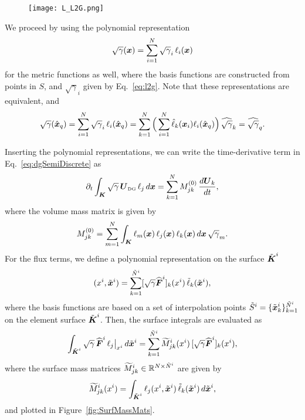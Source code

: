 \documentclass[10pt,preprint]{aastex}
\begin{document}
\begin{figure}[h]
  \begin{center}
     \texttt{[image: L\_L2G.png]}
  \end{center}
  \caption{}
  \label{fig:LL2G}
\end{figure}

We proceed by using the polynomial representation
\begin{equation}
  \sqrt{\gamma}(\boldsymbol{x})=\sum_{i=1}^{N}\sqrt{\gamma}_{i}\,\ell_{i}(\boldsymbol{x})
\end{equation}
for the metric functions as well, where the basis functions are constructed from points in $S$, and $\sqrt{\gamma}_{i}$ given by Eq.~\eqref{eq:l2g}.  
Note that these representations are equivalent, and
\begin{equation}
  \sqrt{\gamma}(\hat{\boldsymbol{x}}_{q})=\sum_{i=1}^{N}\sqrt{\gamma}_{i}\,\ell_{i}(\hat{\boldsymbol{x}}_{q})
  =\sum_{k=1}^{N}\Big(\sum_{i=1}^{N}\hat{\ell}_{k}(\boldsymbol{x}_{i})\ell_{i}(\hat{\boldsymbol{x}}_{q})\Big)\,\widehat{\sqrt{\gamma}}_{k}
  =\widehat{\sqrt{\gamma}}_{q}.  
\end{equation}

Inserting the polynomial representations, we can write the time-derivative term in Eq.~\eqref{eq:dgSemiDiscrete} as
\begin{equation}
  \partial_{t}{}\int_{\boldsymbol{K}}\sqrt{\gamma}\,\boldsymbol{U}_{\mbox{\tiny DG}}\,\ell_{j}\,d\boldsymbol{x}
  =\sum_{k=1}^{N}M_{jk}^{(0)}\,\frac{d \boldsymbol{U}_{k}}{d t},
\end{equation}
where the volume mass matrix is given by
\begin{equation}
  M_{jk}^{(0)}=\sum_{m=1}^{N}\int_{\boldsymbol{K}}\ell_{m}(\boldsymbol{x})\,\ell_{j}(\boldsymbol{x})\,\ell_{k}(\boldsymbol{x})\,d\boldsymbol{x}\,\sqrt{\gamma}_{m}.  
\end{equation}
For the flux terms, we define a polynomial representation on the surface $\tilde{\boldsymbol{K}}^{i}$
\begin{equation}
  [\sqrt{\gamma}\widehat{\bF}^{i}](x^{i},\tilde{\bx}^{i})
  =\sum_{k=1}^{\tilde{N}^{i}}[\sqrt{\gamma}\widehat{\bF}^{i}]_{k}(x^{i})\,\tilde{\ell}_{k}(\tilde{\bx}^{i}),
\end{equation}
where the basis functions are based on a set of interpolation points $\tilde{S}^{i}=\{\tilde{\boldsymbol{x}}_{k}^{i}\}_{k=1}^{\tilde{N}^{i}}$ on the element surface $\tilde{\boldsymbol{K}}^{i}$.  
Then, the surface integrals are evaluated as
\begin{equation}
  \int_{\tilde{\boldsymbol{K}}^{i}}\sqrt{\gamma}\,\widehat{\boldsymbol{F}}^{i}\,\ell_{j}\big|_{x^{i}}\,d\tilde{\boldsymbol{x}}^{i}
  =\sum_{k=1}^{\tilde{N}^{i}}\widetilde{M}_{jk}^{i}(x^{i})\,[\sqrt{\gamma}\widehat{\boldsymbol{F}}^{i}]_{k}(x^{i}),
\end{equation}
where the surface mass matrices $\widetilde{M}_{jk}^{i}\in\mathbb{R}^{N\times\tilde{N}^{i}}$ are given by
\begin{equation}
  \widetilde{M}_{jk}^{i}(x^{i})
  =\int_{\tilde{\boldsymbol{K}}^{i}}\ell_{j}(x^{i},\tilde{\boldsymbol{x}}^{i})\,\tilde{\ell}_{k}(\tilde{\boldsymbol{x}}^{i})\,d\tilde{\boldsymbol{x}}^{i}, 
\end{equation}
and plotted in Figure~\ref{fig:SurfMassMats}.  
\end{document}
